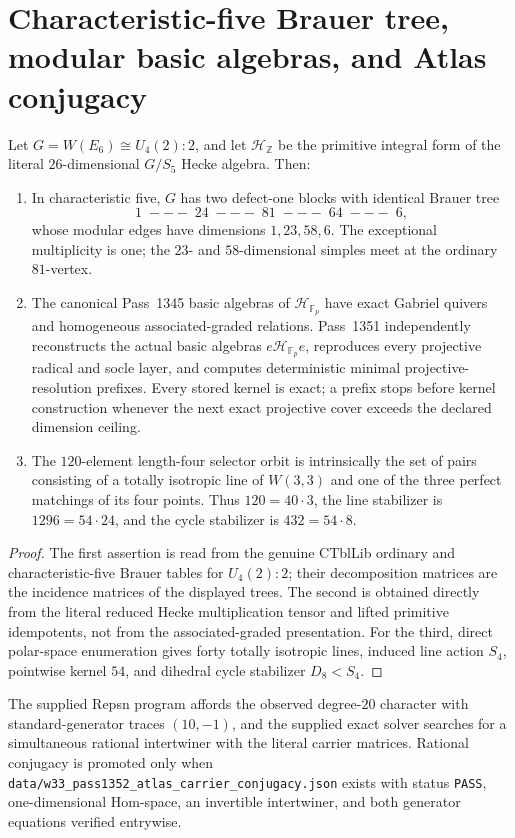 \section{Characteristic-five Brauer tree, modular basic algebras, and Atlas conjugacy}
\label{sec:bt1350-bt1354-brauer-basic-atlas}
\begin{theorem}
Let $G=W(E_6)\cong U_4(2){:}2$, and let $\mathcal H_{\mathbb Z}$ be the primitive integral form of the literal $26$-dimensional $G/S_5$ Hecke algebra. Then:
\begin{enumerate}
\item In characteristic five, $G$ has two defect-one blocks with identical Brauer tree
\[1\;---\;24\;---\;81\;---\;64\;---\;6,\]
whose modular edges have dimensions $1,23,58,6$. The exceptional multiplicity is one; the $23$- and $58$-dimensional simples meet at the ordinary $81$-vertex.
\item The canonical Pass~1345 basic algebras of $\mathcal H_{\mathbb F_p}$ have exact Gabriel quivers and homogeneous associated-graded relations. Pass~1351 independently reconstructs the actual basic algebras $e\mathcal H_{\mathbb F_p}e$, reproduces every projective radical and socle layer, and computes deterministic minimal projective-resolution prefixes. Every stored kernel is exact; a prefix stops before kernel construction whenever the next exact projective cover exceeds the declared dimension ceiling.
\item The $120$-element length-four selector orbit is intrinsically the set of pairs consisting of a totally isotropic line of $W(3,3)$ and one of the three perfect matchings of its four points. Thus $120=40\cdot3$, the line stabilizer is $1296=54\cdot24$, and the cycle stabilizer is $432=54\cdot8$.
\end{enumerate}
\end{theorem}
\begin{proof}
The first assertion is read from the genuine CTblLib ordinary and characteristic-five Brauer tables for $U_4(2){:}2$; their decomposition matrices are the incidence matrices of the displayed trees. The second is obtained directly from the literal reduced Hecke multiplication tensor and lifted primitive idempotents, not from the associated-graded presentation. For the third, direct polar-space enumeration gives forty totally isotropic lines, induced line action $S_4$, pointwise kernel $54$, and dihedral cycle stabilizer $D_8<S_4$.
\end{proof}
\begin{proposition}
The supplied Repsn program affords the observed degree-$20$ character with standard-generator traces $(10,-1)$, and the supplied exact solver searches for a simultaneous rational intertwiner with the literal carrier matrices. Rational conjugacy is promoted only when \texttt{data/w33\_pass1352\_atlas\_carrier\_conjugacy.json} exists with status \texttt{PASS}, one-dimensional Hom-space, an invertible intertwiner, and both generator equations verified entrywise.
\end{proposition}
